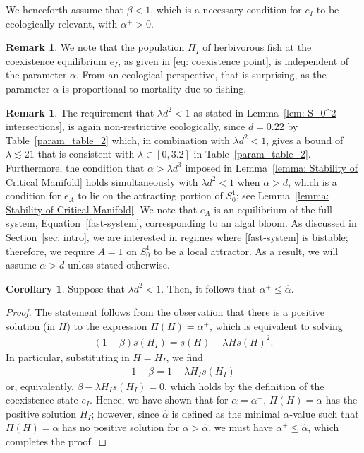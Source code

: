\documentclass{article}
\theoremstyle{definition}
\numberwithin{equation}{section}
\newtheorem{cor}[prop]{Corollary}
\newtheorem{remark}[prop]{Remark}
\begin{document}
We henceforth assume that $\beta<1$, which is a necessary condition for $e_I$ to be ecologically relevant, with $\alpha^+>0$.


\begin{remark}
    We note that the population $H_I$ of herbivorous fish at the coexistence equilibrium $e_I$, as given in \eqref{eq: coexistence point}, is independent of the parameter $\alpha$. From an ecological perspective, that is surprising, as the parameter $\alpha$ is proportional to mortality due to fishing. 
\end{remark}

\begin{remark}
    The requirement that $\lambda d^2<1$ as stated in Lemma~\ref{lem: S_0^2 intersections}, is again non-restrictive ecologically, since $d=0.22$ by Table~\ref{param_table_2} which, in combination with $\lambda d^2<1$, gives a  bound of $\lambda\lesssim 21$ that is consistent with $\lambda \in[0, 3.2]$ in Table~\ref{param_table_2}. Furthermore, the condition that $\alpha>\lambda d^3$ imposed in Lemma~\ref{lemma: Stability of Critical Manifold} holds simultaneously with $\lambda d^2<1$ when $\alpha>d$, which is a condition for $e_A$ to lie on the attracting portion of $S_0^1$; see Lemma~\ref{lemma: Stability of Critical Manifold}. We note that $e_A$ is an equilibrium of the full system, Equation~\eqref{fast-system}, corresponding to an algal bloom. As discussed in Section~\ref{sec: intro}, we are interested in regimes where \eqref{fast-system} is bistable; therefore, we require $A=1$ on $S_0^1$ to be a local attractor.  As a result, we will assume $\alpha>d$ unless stated otherwise. 
\end{remark}

\begin{cor}
    Suppose that $\lambda d^2<1$. Then, it follows that $\alpha^{+}\leq\hat\alpha$.
    \label{cor: hat bound}
\end{cor}
\begin{proof}
    The statement follows from the observation that there is a positive solution (in $H$) to the expression $\Pi(H)=\alpha^{+}$, which is equivalent to solving
    \begin{align*}
        (1-\beta)s(H_I) = s(H)-\lambda H s(H)^2.
    \end{align*}
    In particular, substituting in $H=H_I$, we find
    \begin{align*}
        1-\beta = 1-\lambda H_Is(H_I)
    \end{align*}
    or, equivalently, $\beta-\lambda H_{I}s(H_{I})=0$, which holds by the definition of the coexistence state $e_I$. Hence, we have shown that for $\alpha=\alpha^{+}$, $\Pi(H)=\alpha$ has the positive solution $H_I$; however, since $\hat\alpha$ is defined as the minimal $\alpha$-value such that $\Pi(H)=\alpha$ has no positive solution for $\alpha>\hat\alpha$, we must have $\alpha^{+}\leq \hat\alpha$, which completes the proof.
\end{proof}
\end{document}
